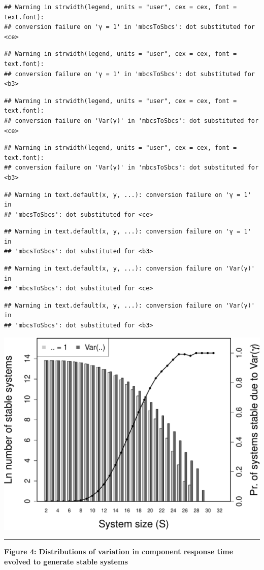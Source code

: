\documentclass[]{article}
\begin{document}
\begin{verbatim}
## Warning in strwidth(legend, units = "user", cex = cex, font = text.font):
## conversion failure on 'γ = 1' in 'mbcsToSbcs': dot substituted for <ce>
\end{verbatim}

\begin{verbatim}
## Warning in strwidth(legend, units = "user", cex = cex, font = text.font):
## conversion failure on 'γ = 1' in 'mbcsToSbcs': dot substituted for <b3>
\end{verbatim}

\begin{verbatim}
## Warning in strwidth(legend, units = "user", cex = cex, font = text.font):
## conversion failure on 'Var(γ)' in 'mbcsToSbcs': dot substituted for <ce>
\end{verbatim}

\begin{verbatim}
## Warning in strwidth(legend, units = "user", cex = cex, font = text.font):
## conversion failure on 'Var(γ)' in 'mbcsToSbcs': dot substituted for <b3>
\end{verbatim}

\begin{verbatim}
## Warning in text.default(x, y, ...): conversion failure on 'γ = 1' in
## 'mbcsToSbcs': dot substituted for <ce>
\end{verbatim}

\begin{verbatim}
## Warning in text.default(x, y, ...): conversion failure on 'γ = 1' in
## 'mbcsToSbcs': dot substituted for <b3>
\end{verbatim}

\begin{verbatim}
## Warning in text.default(x, y, ...): conversion failure on 'Var(γ)' in
## 'mbcsToSbcs': dot substituted for <ce>
\end{verbatim}

\begin{verbatim}
## Warning in text.default(x, y, ...): conversion failure on 'Var(γ)' in
## 'mbcsToSbcs': dot substituted for <b3>
\end{verbatim}

\includegraphics{ms_files/figure-latex/unnamed-chunk-9-1.pdf}

\begin{center}\rule{0.5\linewidth}{\linethickness}\end{center}

\textbf{Figure 4: Distributions of variation in component response time
evolved to generate stable systems}
\end{document}
